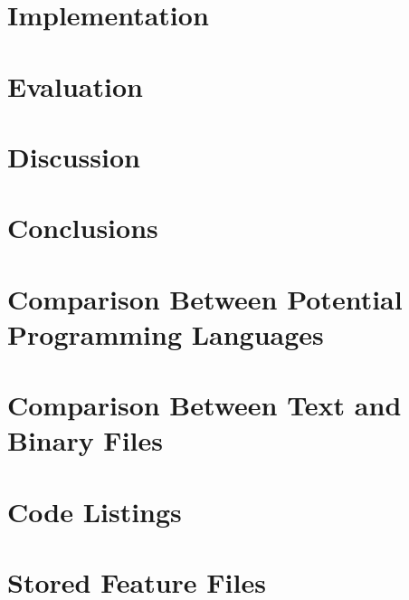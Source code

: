 \documentclass[11pt,openright,twoside,a4paper]{report}
\begin{document}
\chapter{Implementation}
\label{ch:chapter5}


\chapter{Evaluation}
\label{ch:chapter6}


\chapter{Discussion}
\label{ch:chapter7}


\chapter{Conclusions}
\label{ch:chapter8}




\let\cleardoublepage\clearpage %
\appendix

\chapter{Comparison Between Potential Programming Languages}
\label{ch:appendix-comparison-programming-languages}


\chapter{Comparison Between Text and Binary Files}
\label{ch:appendix-comparison-text-vs-binary}


\chapter{Code Listings}
\label{ch:appendix-code-listings}


\chapter{Stored Feature Files}
\label{ch:appendix-stored-feature-files}

\end{document}

